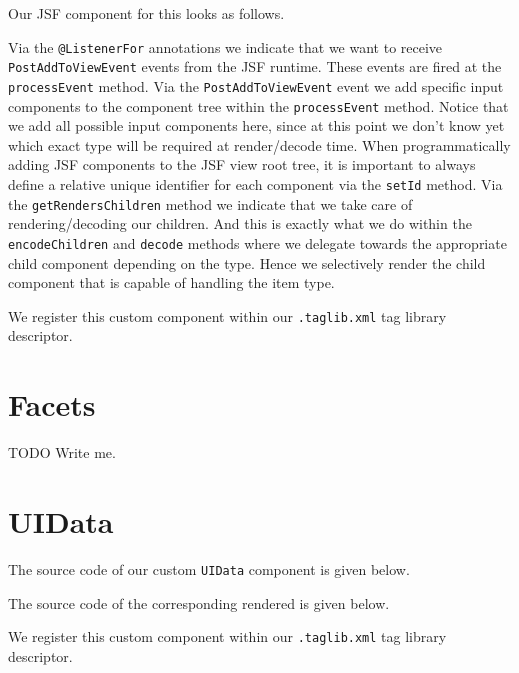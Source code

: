 Our JSF component for this looks as follows.

Via the \texttt{@ListenerFor} annotations we indicate that we want to receive \texttt{PostAddToViewEvent} events from the JSF runtime.
These events are fired at the \texttt{processEvent} method.
Via the \texttt{PostAddToViewEvent} event we add specific input components to the component tree within the \texttt{processEvent} method.
Notice that we add all possible input components here,  since at this point we don't know yet which exact type will be required at render/decode time.
When programmatically adding JSF components to the JSF view root tree, it is important to always define a relative unique identifier for each component via the \texttt{setId} method.
Via the \texttt{getRendersChildren} method we indicate that we take care of rendering/decoding our children.
And this is exactly what we do within the \texttt{encodeChildren} and \texttt{decode} methods where we delegate towards the appropriate child component depending on the type.
Hence we selectively render the child component that is capable of handling the item type.

We register this custom component within our \texttt{.taglib.xml} tag library descriptor.


\section{Facets}
\begin{TODO}{TODO}
	Write me.
\end{TODO}

\section{UIData}
The source code of our custom \texttt{UIData} component is given below.


The source code of the corresponding rendered is given below.


We register this custom component within our \texttt{.taglib.xml} tag library descriptor.


